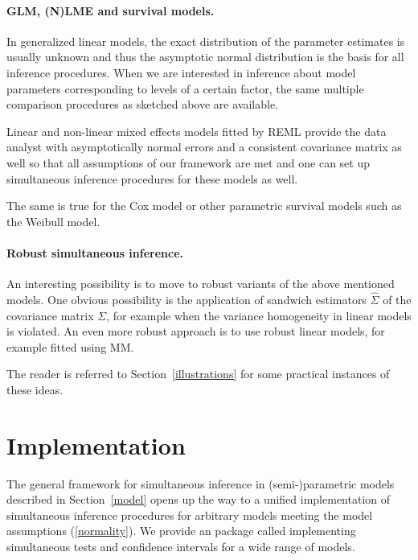 \documentclass[12pt]{article}
\begin{document}
\paragraph{GLM, (N)LME and survival models.}

In generalized linear models, the exact distribution of the parameter estimates
is usually unknown and thus the asymptotic normal distribution is the basis for all
inference procedures. When we are interested in inference about model
parameters corresponding to levels of a certain factor, the same multiple 
comparison procedures as sketched above are available. 

Linear and non-linear mixed effects models fitted by REML provide
the data analyst with asymptotically normal errors and a consistent
covariance matrix as well so that all assumptions of our framework
are met and one can set up simultaneous inference procedures
for these models as well.

The same is true for the Cox model or other parametric survival models
such as the Weibull model.

\paragraph{Robust simultaneous inference.}

An interesting possibility is to move to robust variants of the above
mentioned models. One obvious possibility is the application
of sandwich estimators $\hat{\Sigma}$ of the covariance matrix $\Sigma$, 
for example when the variance homogeneity in linear models is violated.
An even more robust approach is to use robust linear models, for example
fitted using MM.

The reader is referred to Section~\ref{illustrations} for some practical
instances of these ideas.

\section{Implementation} \label{implementation}

The general framework for simultaneous inference in 
(semi-)parametric models described in Section~\ref{model}
opens up the way to a unified implementation of simultaneous inference
procedures for arbitrary models meeting the model assumptions 
(\ref{normality}). We provide an \RR{} \citep{R2007} package called 
 \citep{pkg:multcomp} implementing
simultaneous tests and confidence intervals for a wide range of models.
\end{document}
